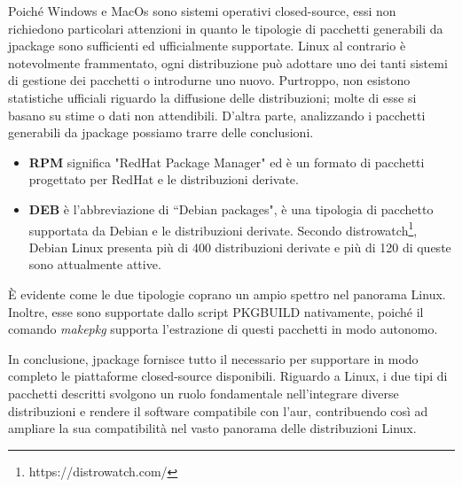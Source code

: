 Poiché Windows e MacOs sono sistemi operativi closed-source, essi non richiedono particolari attenzioni in quanto le tipologie di pacchetti generabili da jpackage sono sufficienti ed ufficialmente supportate. Linux al contrario è notevolmente frammentato, ogni distribuzione può adottare uno dei tanti sistemi di gestione dei pacchetti o introdurne uno nuovo. Purtroppo, non esistono statistiche ufficiali riguardo la diffusione delle distribuzioni; molte di esse si basano su stime o dati non attendibili. D'altra parte, analizzando i pacchetti generabili da jpackage possiamo trarre delle conclusioni.
\begin{itemize}
	\item \textbf{RPM} significa "RedHat Package Manager" ed è un formato di pacchetti progettato per RedHat e le distribuzioni derivate. 
	\item \textbf{DEB} è l'abbreviazione di ``Debian packages", è una tipologia di pacchetto supportata da Debian e le distribuzioni derivate. Secondo distrowatch\footnote{https://distrowatch.com/}, Debian Linux presenta più di 400 distribuzioni derivate e più di 120 di queste sono attualmente attive.
\end{itemize}
È evidente come le due tipologie coprano un ampio spettro nel panorama Linux. Inoltre, esse sono supportate dallo script PKGBUILD nativamente, poiché il comando \textit{makepkg} supporta l'estrazione di questi pacchetti in modo autonomo. 

In conclusione, jpackage fornisce tutto il necessario per supportare in modo completo le piattaforme closed-source disponibili. Riguardo a Linux, i due tipi di pacchetti descritti svolgono un ruolo fondamentale nell'integrare diverse distribuzioni e rendere il software compatibile con l'\ac{aur}, contribuendo così ad ampliare la sua compatibilità nel vasto panorama delle distribuzioni Linux.
